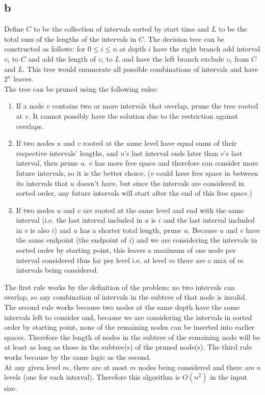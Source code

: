 \documentclass[letterpaper,notitlepage,twoside]{article}
\begin{document}
\subsection*{b}
Define $C$ to be the collection of intervals sorted by start time and $L$ to be the total sum of the lengths of the intervals in $C$. 
The decision tree can be constructed as follows: for $0 \leq i \leq n$ at depth $i$ have the right branch add interval $v_i$ to $C$ and add the length of $v_i$ to $L$ and have the left branch exclude $v_i$ from $C$ and $L$. This tree would enumerate all possible combinations of intervals and have $2^n$ leaves. \\
The tree can be pruned using the following rules:
\begin{enumerate}
\item If a node $v$ contains two or more intervals that overlap, prune the tree rooted at $v$. It cannot possibly have the solution due to the restriction against overlaps.
\item If two nodes $u$ and $v$ rooted at the same level have equal sums of their respective intervals' lengths, and $u$'s last interval ends later than $v$'s last interval, then prune $u$. $v$ has more free space and therefore can consider more future intervals, so it is the better choice. ($v$ could have free space in between its intervals that $u$ doesn't have, but since the intervals are considered in sorted order, any future intervals will start after the end of this free space.) 
\item If two nodes $u$ and $v$ are rooted at the same level and end with the same interval (i.e. the last interval included in $u$ is $i$ and the last interval included in $v$ is also $i$) and $u$ has a shorter total length, prune $u$. Because $u$ and $v$ have the same endpoint (the endpoint of $i$) and we are considering the intervals in sorted order by starting point, this leaves a maximum of one node per interval considered thus far per level i.e. at level $m$ there are a max of $m$ intervals being considered. 
\end{enumerate}
The first rule works by the definition of the problem: no two intervals can overlap, so any combination of intervals in the subtree of that node is invalid. The second rule works because two nodes at the same depth have the same intervals left to consider and, because we are considering the intervals in sorted order by starting point, none of the remaining nodes can be inserted into earlier spaces. Therefore the length of nodes in the subtree of the remaining node will be at least as long as those in the subtree(s) of the pruned node(s). The third rule works because by the same logic as the second. \\
At any given level $m$, there are at most $m$ nodes being considered and there are $n$ levels (one for each interval). Therefore this algorithm is $O(n^2)$ in the input size.\\
\end{document}
